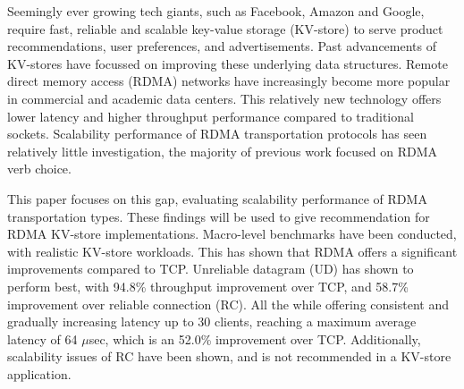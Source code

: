 


\begin{abstracts}        %

    Seemingly ever growing tech giants, such as Facebook, Amazon and Google, require fast, reliable and scalable key-value storage (KV-store) to serve product recommendations, user preferences, and advertisements.
    Past advancements of KV-stores have focussed on improving these underlying data structures.
    Remote direct memory access (RDMA) networks have increasingly become more popular in commercial and academic data centers.
    This relatively new technology offers lower latency and higher throughput performance compared to traditional sockets.
    Scalability performance of RDMA transportation protocols has seen relatively little investigation, the majority of previous work focused on RDMA verb choice.

    This paper focuses on this gap, evaluating scalability performance of RDMA transportation types.
    These findings will be used to give recommendation for RDMA KV-store implementations.
    Macro-level benchmarks have been conducted, with realistic KV-store workloads.
    This has shown that RDMA offers a significant improvements compared to TCP.
    Unreliable datagram (UD) has shown to perform best, with 94.8\% throughput improvement over TCP, and 58.7\% improvement over reliable connection (RC).
    All the while offering consistent and gradually increasing latency up to 30 clients, reaching a maximum average latency of 64 $\mu$sec, which is an 52.0\% improvement over TCP.
    Additionally, scalability issues of RC have been shown, and is not recommended in a KV-store application.

\end{abstracts}



